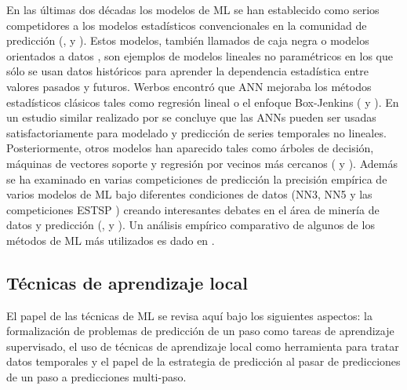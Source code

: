 \documentclass{llncs}
\begin{document}
En las últimas dos décadas los modelos de ML se han establecido como serios competidores a los modelos estadísticos convencionales en la comunidad de predicción (\cite{Ahmed2010594},\cite{Palit2005} y \cite{Zhang199835}). Estos modelos, también llamados de caja negra o modelos orientados a datos \cite{Mitchell1997}, son ejemplos de modelos lineales no paramétricos en los que sólo se usan datos históricos para aprender la dependencia estadística entre valores pasados y futuros. Werbos encontró que ANN mejoraba los métodos estadísticos clásicos tales como regresión lineal o el enfoque Box-Jenkins (\cite{Werbos1974} y \cite{Werbos1988339}). En un estudio similar realizado por \cite{Lapedes1987} se concluye que las ANNs pueden ser usadas satisfactoriamente para modelado y predicción de series temporales no lineales. Posteriormente, otros modelos han aparecido tales como árboles de decisión, máquinas de vectores soporte y regresión por vecinos más cercanos (\cite{Hastie2001} y \cite{Alpaydin2004}). Además se ha examinado en varias competiciones de predicción la precisión empírica de varios modelos de ML bajo diferentes condiciones de datos (NN3, NN5 y las competiciones ESTSP \cite{Crone2009456}\cite{Crone}\cite{Lendasse2007}) creando interesantes debates en el área de minería de datos y predicción (\cite{Hand2008}, \cite{Price2009452} y \cite{Crone2009456}). Un análisis empírico comparativo de algunos de los métodos de ML más utilizados es dado en \cite{ahmed2010empirical}. 


\subsection{Técnicas de aprendizaje local\\}
El papel de las técnicas de ML se revisa aquí bajo los siguientes aspectos: la formalización de problemas de predicción de un paso como tareas de aprendizaje supervisado, el uso de técnicas de aprendizaje local como herramienta para tratar datos temporales y el papel de la estrategia de predicción al pasar de predicciones de un paso a predicciones multi-paso. 
\end{document}
